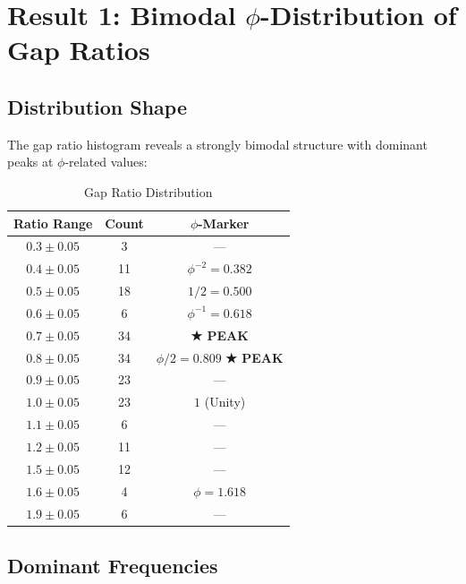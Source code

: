 \documentclass[11pt,a4paper]{article}
\begin{document}
\newpage

\section{Result 1: Bimodal $\phi$-Distribution of Gap Ratios}
\label{sec:bimodal}

\subsection{Distribution Shape}

The gap ratio histogram reveals a strongly bimodal structure with dominant peaks at $\phi$-related values:

\begin{table}[H]
\centering
\caption{Gap Ratio Distribution}
\label{tab:histogram}
\begin{tabular}{@{}ccc@{}}
\toprule
\textbf{Ratio Range} & \textbf{Count} & \textbf{$\phi$-Marker} \\
\midrule
$0.3 \pm 0.05$ & 3 & — \\
$0.4 \pm 0.05$ & 11 & $\phi^{-2} = 0.382$ \\
$0.5 \pm 0.05$ & 18 & $1/2 = 0.500$ \\
$0.6 \pm 0.05$ & 6 & $\phi^{-1} = 0.618$ \\
$0.7 \pm 0.05$ & 34 & \textbf{★ PEAK} \\
$0.8 \pm 0.05$ & 34 & $\phi/2 = 0.809$ \textbf{★ PEAK} \\
$0.9 \pm 0.05$ & 23 & — \\
$1.0 \pm 0.05$ & 23 & $1$ (Unity) \\
$1.1 \pm 0.05$ & 6 & — \\
$1.2 \pm 0.05$ & 11 & — \\
$1.5 \pm 0.05$ & 12 & — \\
$1.6 \pm 0.05$ & 4 & $\phi = 1.618$ \\
$1.9 \pm 0.05$ & 6 & — \\
\bottomrule
\end{tabular}
\end{table}

\subsection{Dominant Frequencies}
\end{document}
